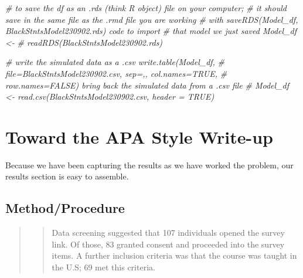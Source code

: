 \documentclass[
  11pt,
]{book}
\newenvironment{Shaded}{\begin{snugshade}}{\end{snugshade}}
\newcommand{\CommentTok}[1]{\textcolor[rgb]{0.37,0.37,0.37}{\textit{#1}}}
\begin{document}
\begin{Shaded}
\begin{Highlighting}[]
\CommentTok{\# to save the df as an .rds (think \textquotesingle{}R object\textquotesingle{}) file on your computer;}
\CommentTok{\# it should save in the same file as the .rmd file you are working}
\CommentTok{\# with saveRDS(Model\_df, \textquotesingle{}BlackStntsModel230902.rds\textquotesingle{}) code to import}
\CommentTok{\# that model we just saved Model\_df \textless{}{-}}
\CommentTok{\# readRDS(\textquotesingle{}BlackStntsModel230902.rds\textquotesingle{})}
\end{Highlighting}
\end{Shaded}

\begin{Shaded}
\begin{Highlighting}[]
\CommentTok{\# write the simulated data as a .csv write.table(Model\_df,}
\CommentTok{\# file=\textquotesingle{}BlackStntsModel230902.csv\textquotesingle{}, sep=\textquotesingle{},\textquotesingle{}, col.names=TRUE,}
\CommentTok{\# row.names=FALSE) bring back the simulated data from a .csv file}
\CommentTok{\# Model\_df \textless{}{-} read.csv(\textquotesingle{}BlackStntsModel230902.csv\textquotesingle{}, header = TRUE)}
\end{Highlighting}
\end{Shaded}

\hypertarget{toward-the-apa-style-write-up}{%
\section{Toward the APA Style Write-up}\label{toward-the-apa-style-write-up}}

Because we have been capturing the results as we have worked the problem, our results section is easy to assemble.

\hypertarget{methodprocedure}{%
\subsection{Method/Procedure}\label{methodprocedure}}

\begin{quote}
\begin{quote}
Data screening suggested that 107 individuals opened the survey link. Of those, 83 granted consent and proceeded into the survey items. A further inclusion criteria was that the course was taught in the U.S; 69 met this criteria.
\end{quote}
\end{quote}
\end{document}
